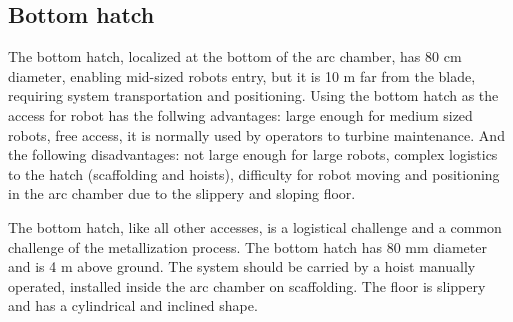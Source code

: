 \subsection{Bottom hatch}
The bottom hatch, localized at the bottom of the arc chamber, has 80 cm
diameter, enabling mid-sized robots entry, but it is 10 m far from the blade,
requiring system transportation and positioning. Using the bottom hatch as the
access for robot has the follwing advantages: large enough for medium sized
robots, free access, it is normally used by operators to turbine maintenance.
And the following disadvantages: not large enough for large robots, complex
logistics to the hatch (scaffolding and hoists), difficulty for robot moving
and positioning in the arc chamber due to the slippery and sloping floor.




The bottom hatch, like all other accesses, is a logistical challenge and
a common challenge of the metallization process. The bottom hatch has 80 mm
diameter and is 4 m above ground. The system should be carried by a hoist
manually operated, installed inside the arc chamber on scaffolding. The floor
is slippery and has a cylindrical and inclined shape.


